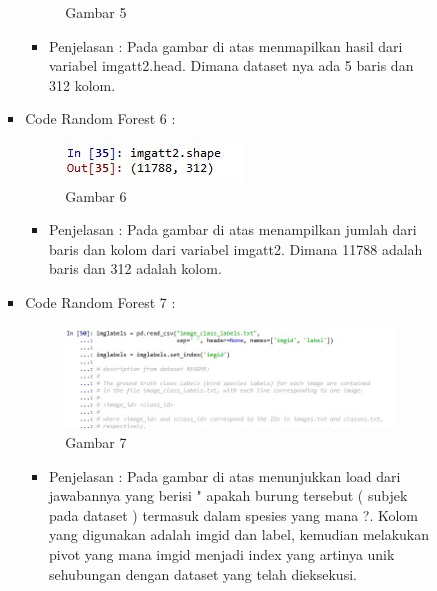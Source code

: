 \begin{enumerate}
\begin{itemize}
\begin{itemize}
\begin{itemize}
\begin{figure}[ht]
\caption{Gambar 5}
\label{contoh}
\end{figure}
\par
\begin{itemize}
\item Penjelasan : Pada gambar di atas menmapilkan hasil dari variabel imgatt2.head. Dimana dataset nya ada 5 baris dan 312 kolom.
\par
\par
\end{itemize}
\item Code Random Forest 6 :
\par
\begin{figure}[ht]
\centering
\includegraphics[scale=0.7]{figures/cod6.jpg}
\caption{Gambar 6}
\label{contoh}
\end{figure}
\par
\begin{itemize}
\item Penjelasan : Pada gambar di atas menampilkan jumlah dari baris dan kolom dari variabel imgatt2. Dimana 11788 adalah baris dan 312 adalah kolom.
\par
\par
\end{itemize}
\item Code Random Forest 7 :
\par
\begin{figure}[ht]
\centering
\includegraphics[scale=0.7]{figures/cod7.jpeg}
\caption{Gambar 7}
\label{contoh}
\end{figure}
\par
\begin{itemize}
\item Penjelasan : Pada gambar di atas menunjukkan load dari  jawabannya yang berisi " apakah burung tersebut ( subjek pada dataset ) termasuk dalam spesies yang mana ?. Kolom yang digunakan adalah imgid dan label, kemudian melakukan pivot yang mana imgid menjadi index yang artinya unik sehubungan dengan dataset yang telah dieksekusi.

\end{itemize}
\end{itemize}
\end{itemize}
\end{itemize}
\end{enumerate}
